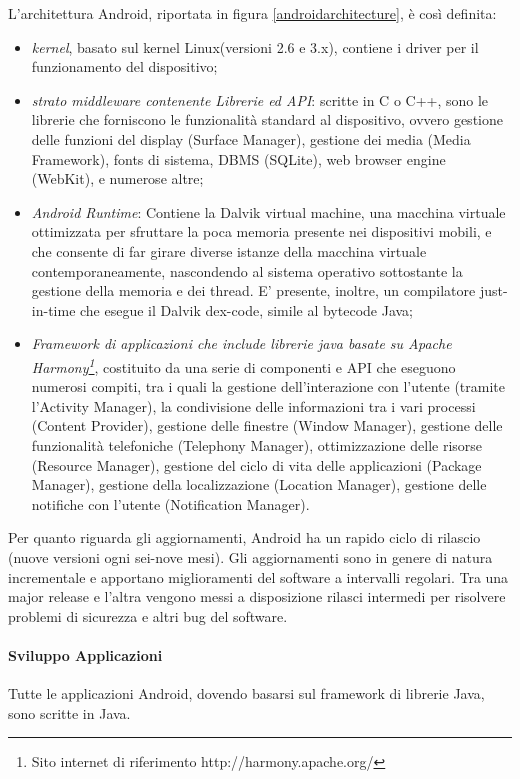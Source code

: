 L'architettura Android, riportata in figura \ref{androidarchitecture}, è così definita:
\begin{itemize}
\item \emph{kernel}, basato sul kernel Linux(versioni 2.6 e 3.x), contiene i driver per il funzionamento del dispositivo;
\item \emph{strato middleware contenente Librerie ed API}: scritte in C o C++, sono le librerie che forniscono le funzionalità standard al dispositivo, ovvero gestione delle funzioni del display (Surface Manager), gestione dei media (Media Framework), fonts di sistema, DBMS (SQLite), web browser engine (WebKit), e numerose altre;
\item \emph{Android Runtime}: Contiene la Dalvik virtual machine, una macchina virtuale ottimizzata per sfruttare la poca memoria presente nei dispositivi mobili, e che consente di far girare diverse istanze della macchina virtuale contemporaneamente, nascondendo al sistema operativo sottostante la gestione della memoria e dei thread. E' presente, inoltre, un compilatore just-in-time che esegue il Dalvik dex-code, simile al bytecode Java;
\item \emph{Framework di applicazioni che include librerie java basate su Apache Harmony\footnote{Sito internet di riferimento http://harmony.apache.org/}},  costituito da una serie di componenti e API che eseguono numerosi compiti, tra i quali la gestione dell'interazione con l'utente (tramite l'Activity Manager), la condivisione delle informazioni tra i vari processi (Content Provider), gestione delle finestre (Window Manager), gestione delle funzionalità telefoniche (Telephony Manager), ottimizzazione delle risorse (Resource Manager), gestione del ciclo di vita delle applicazioni (Package Manager), gestione della localizzazione (Location Manager), gestione delle notifiche con l'utente (Notification Manager).
\end{itemize}

Per quanto riguarda gli aggiornamenti, Android ha un rapido ciclo di rilascio (nuove versioni ogni sei-nove mesi).
Gli aggiornamenti sono in genere di natura incrementale e apportano miglioramenti del software a intervalli regolari. Tra una major release e l'altra vengono messi a disposizione rilasci intermedi per risolvere problemi di sicurezza e altri bug del software.
\\


\paragraph{Sviluppo Applicazioni}
Tutte le applicazioni Android, dovendo basarsi sul framework di librerie Java, sono scritte in Java.

